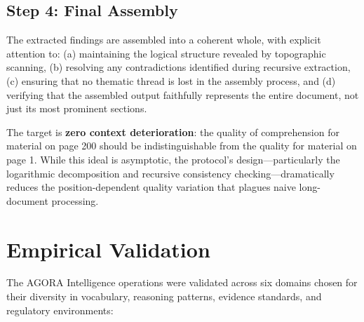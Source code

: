 \documentclass[11pt,a4paper]{article}
\begin{document}
\subsection{Step 4: Final Assembly}

The extracted findings are assembled into a coherent whole, with explicit attention to: (a) maintaining the logical structure revealed by topographic scanning, (b) resolving any contradictions identified during recursive extraction, (c) ensuring that no thematic thread is lost in the assembly process, and (d) verifying that the assembled output faithfully represents the entire document, not just its most prominent sections.

The target is \textbf{zero context deterioration}: the quality of comprehension for material on page 200 should be indistinguishable from the quality for material on page 1. While this ideal is asymptotic, the protocol's design---particularly the logarithmic decomposition and recursive consistency checking---dramatically reduces the position-dependent quality variation that plagues naive long-document processing.

\section{Empirical Validation}
\label{sec:validation}

The AGORA Intelligence operations were validated across six domains chosen for their diversity in vocabulary, reasoning patterns, evidence standards, and regulatory environments:
\end{document}
